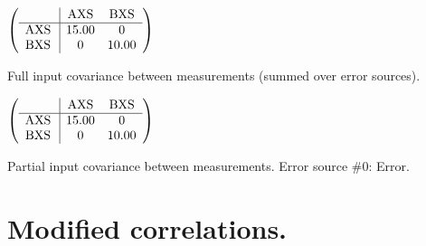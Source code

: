 \begin{table}[H]
\scriptsize
\begin{center}
\renewcommand{\arraystretch}{1.1}
\begin{math}\left(\begin{array}{c|cc}
 & \mathrm{AXS} & 
\mathrm{BXS} \\
\hline
\mathrm{AXS} \hspace*{2pt} &      15.00 &  0 \\
\mathrm{BXS} \hspace*{2pt} &  0 &      10.00 \\
\end{array}\right)\end{math}
\caption{Full input covariance between measurements (summed over error sources).}
\renewcommand{\arraystretch}{1}
\end{center}
\end{table}
\begin{table}[H]
\scriptsize
\begin{center}
\renewcommand{\arraystretch}{1.1}
\begin{math}\left(\begin{array}{c|cc}
 & \mathrm{AXS} & 
\mathrm{BXS} \\
\hline
\mathrm{AXS} \hspace*{2pt} &      15.00 &  0 \\
\mathrm{BXS} \hspace*{2pt} &  0 &      10.00 \\
\end{array}\right)\end{math}
\caption{Partial input covariance between measurements. Error source \#0: Error.}
\renewcommand{\arraystretch}{1}
\end{center}
\end{table}
\clearpage
\section{Modified correlations.}
